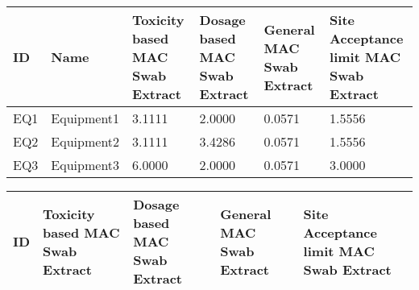 \documentclass{article}
\begin{document}
        \begin{longtable}[l]{|p{1.5cm}|p{2cm}|p{3cm}|p{3cm}|p{3cm}|p{3cm}|}

\hline
ID & Name & Toxicity based MAC Swab Extract & Dosage based MAC Swab Extract & General MAC Swab Extract  & Site Acceptance limit MAC Swab Extract\\
\hline

EQ1 & Equipment1 & 3.1111 & 2.0000 & 0.0571 & 1.5556\\
\hline
EQ2 & Equipment2 & 3.1111 & 3.4286 & 0.0571 & 1.5556\\
\hline
EQ3 & Equipment3 & 6.0000 & 2.0000 & 0.0571 & 3.0000\\
\hline

    \end{longtable}
    
        \begin{longtable}[l]{|p{1.5cm}|p{3cm}|p{3cm}|p{3cm}|p{3cm}|}

\hline
ID & Toxicity based MAC Swab Extract & Dosage based MAC Swab Extract & General MAC Swab Extract  & Site Acceptance limit MAC Swab Extract\\
\hline


\end{longtable}
\end{document}
